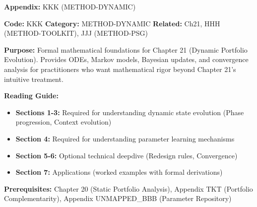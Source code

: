\begin{tcolorbox}[colback=blue!5!white, colframe=blue!75!black, title=Quick Reference: Portfolio Evolution Dynamics]

\textbf{Appendix:} KKK (METHOD-DYNAMIC)

\textbf{Code:} KKK \quad \textbf{Category:} METHOD-DYNAMIC \quad \textbf{Related:} Ch21, HHH (METHOD-TOOLKIT), JJJ (METHOD-PSG)

\textbf{Purpose:} Formal mathematical foundations for Chapter 21 (Dynamic Portfolio Evolution). Provides ODEs, Markov models, Bayesian updates, and convergence analysis for practitioners who want mathematical rigor beyond Chapter 21's intuitive treatment.

\textbf{Reading Guide:}
\begin{itemize}[nosep]
\item \textbf{Sections 1-3:} Required for understanding dynamic state evolution (Phase progression, Context evolution)
\item \textbf{Section 4:} Required for understanding parameter learning mechanisms
\item \textbf{Section 5-6:} Optional technical deepdive (Redesign rules, Convergence)
\item \textbf{Section 7:} Applications (worked examples with formal derivations)
\end{itemize}

\textbf{Prerequisites:} Chapter 20 (Static Portfolio Analysis), Appendix TKT (Portfolio Complementarity), Appendix UNMAPPED_BBB (Parameter Repository)

\end{tcolorbox}


